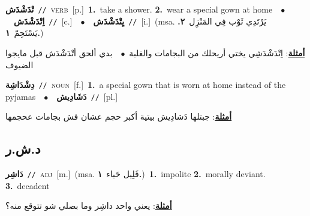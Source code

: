 \documentclass[10pt,a4paper,twoside]{article} %
\begin{document}
\begin{multicols}{2}
{\setlength\topsep{0pt}\textbf{\foreignlanguage{arabic}{تْدَشْدَش}}\ {\color{gray}\texttt{//}\color{black}}\ \textsc{verb}\ [p.]\ \textbf{1.}~take a shower.  \textbf{2.}~wear a special gown at home\ \ $\bullet$\ \ \setlength\topsep{0pt}\textbf{\foreignlanguage{arabic}{اِتْدَشْدَش}}\ {\color{gray}\texttt{//}\color{black}}\ [c.]\ \ $\bullet$\ \ \setlength\topsep{0pt}\textbf{\foreignlanguage{arabic}{يِتْدَشْدَش}}\ {\color{gray}\texttt{//}\color{black}}\ [i.]\ \color{gray}(msa. \foreignlanguage{arabic}{يَرْتَدِي ثَوْب فِي المَنْزِل}~\foreignlanguage{arabic}{\textbf{٢.}}  \foreignlanguage{arabic}{يَسْتَحِمّ}~\foreignlanguage{arabic}{\textbf{١.}})\color{black}\  \begin{flushright}\color{gray}\foreignlanguage{arabic}{\textbf{\underline{\foreignlanguage{arabic}{أمثلة}}}: اِتْدَشْدَشِي يختي أريحلك من البجامات والغلبة\ $\bullet$\ \  بدي ألحق أتْدَشْدَش قبل مايجوا الضيوف}\end{flushright}\color{black}} \vspace{2mm}

{\setlength\topsep{0pt}\textbf{\foreignlanguage{arabic}{دِشْدَاشِة}}\ {\color{gray}\texttt{//}\color{black}}\ \textsc{noun}\ [f.]\ \textbf{1.}~a special gown that is worn at home instead of the pyjamas\ \ $\bullet$\ \ \setlength\topsep{0pt}\textbf{\foreignlanguage{arabic}{دَشَادِيش}}\ {\color{gray}\texttt{//}\color{black}}\ [pl.]\  \begin{flushright}\color{gray}\foreignlanguage{arabic}{\textbf{\underline{\foreignlanguage{arabic}{أمثلة}}}: جبتلها دَشادِيش بيتية أكبر حجم عشان فش بجامات عحجمها}\end{flushright}\color{black}} \vspace{2mm}

\vspace{-3mm}
\subsection*{\color{blue}\foreignlanguage{arabic}{د.ش.ر}\color{blue}{}} 

{\setlength\topsep{0pt}\textbf{\foreignlanguage{arabic}{دَاشِر}}\ {\color{gray}\texttt{//}\color{black}}\ \textsc{adj}\ [m.]\ \color{gray}(msa. \foreignlanguage{arabic}{قَلِيل حَياء}~\foreignlanguage{arabic}{\textbf{١.}})\color{black}\ \textbf{1.}~impolite  \textbf{2.}~morally deviant.  \textbf{3.}~decadent\  \begin{flushright}\color{gray}\foreignlanguage{arabic}{\textbf{\underline{\foreignlanguage{arabic}{أمثلة}}}: يعني واحد داشِر وما بصلي شو تتوقع منه؟}\end{flushright}\color{black}} \vspace{2mm}


\end{multicols}
\end{document}
